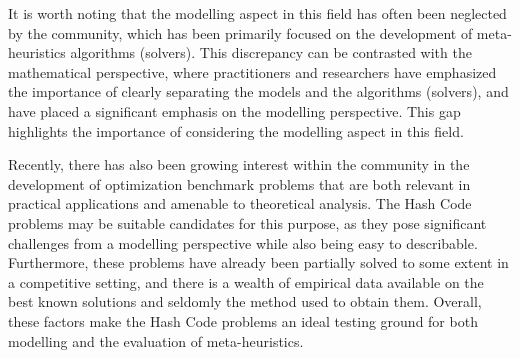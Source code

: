 It is worth noting that the modelling aspect in this field has often been
neglected by the community, which has been primarily focused on the development
of meta-heuristics algorithms (solvers). This discrepancy can be contrasted with
the mathematical perspective, where practitioners and researchers have
emphasized the importance of clearly separating the models and the algorithms
(solvers), and have placed a significant emphasis on the modelling perspective.
This gap highlights the importance of considering the modelling aspect in this
field.

Recently, there has also been growing interest within the community in the
development of optimization benchmark problems that are both relevant in
practical applications and amenable to theoretical analysis. The Hash Code
problems may be suitable candidates for this purpose, as they pose significant
challenges from a modelling perspective while also being easy to describable.
Furthermore, these problems have already been partially solved to some extent
in a competitive setting, and there is a wealth of empirical data available on
the best known solutions and seldomly the method used to obtain them. Overall,
these factors make the Hash Code problems an ideal testing ground for both
modelling and the evaluation of meta-heuristics.